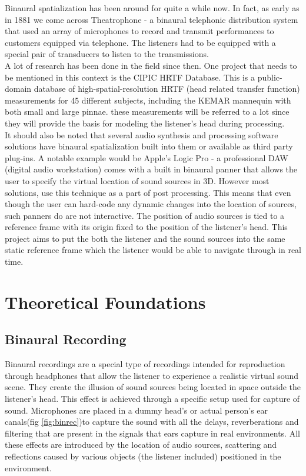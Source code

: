 \documentclass[a4paper,12pt,oneside]{article}
\begin{document}
Binaural spatialization has been around for quite a while now. In fact, as early as in 1881 we come across Theatrophone - a binaural telephonic distribution system that used an array of microphones to record and transmit performances to customers equipped via telephone. The listeners had to be equipped with a special pair of transducers to listen to the transmissions.\\

A lot of research has been done in the field since then. One project that needs to be mentioned in this context is the CIPIC HRTF Database. This is a public-domain database of high-spatial-resolution HRTF (head related transfer function) measurements for 45 different subjects, including the KEMAR mannequin with both small and large pinnae. these measurements will be referred to a lot since they will provide the basis for modeling the listener's head during processing.\cite{cipic1}\\

It should also be noted that several audio synthesis and processing software solutions have binaural spatialization built into them or available as third party plug-ins. A notable example would be Apple's Logic Pro - a professional DAW (digital audio workstation) comes with a built in binaural panner that allows the user to specify the virtual location of sound sources in 3D. However most solutions, use this technique as a part of post processing. This means that even though the user can hard-code any dynamic changes into the location of sources, such panners do are not interactive. The position of audio sources is tied to a reference frame with its origin fixed to the position of the listener's head. This project aims to put the both the listener and the sound sources into the same static reference frame which the listener would be able to navigate through in real time.\cite{aap1}
  
\section{Theoretical Foundations}
  
\subsection{Binaural Recording}
  
Binaural recordings are a special type of recordings intended for reproduction through headphones that allow the listener to experience a realistic virtual sound scene. They create the illusion of sound sources being located in space outside the listener's head. This effect is achieved through a specific setup used for capture of sound. Microphones are placed in a dummy head's or actual person's ear canals(fig \ref{fig:binrec})to capture the sound with all the delays, reverberations and filtering that are present in the signals that ears capture in real environments. All these effects are introduced by the location of audio sources, scattering and reflections caused by various objects (the listener included) positioned in the environment.\cite{hrtf1}\\
\end{document}
